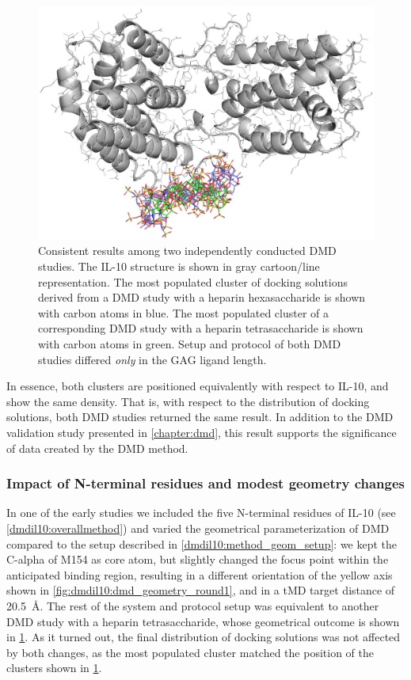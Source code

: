 \begin{figure}
\centering
\includegraphics[width=1.0\textwidth]{gfx/dmdil10/hp_hexa_vs_tetra_clusters_position_match_cropped.jpg}
\caption[]{Consistent results among two independently conducted DMD studies. The
IL-10 structure is shown in gray cartoon/line representation. The most populated
cluster of docking solutions derived from a DMD study with a heparin
hexasaccharide is shown with carbon atoms in blue. The most populated cluster of
a corresponding DMD study with a heparin tetrasaccharide is shown with carbon
atoms in green. Setup and protocol of both DMD studies differed \textit{only} in
the GAG ligand length.}
\label{fig:dmdil10:hp_hexa_vs_tetra_clusters_position_match}
\end{figure}

In essence, both clusters are positioned equivalently with respect to IL-10, and
show the same density. That is, with respect to the distribution of docking
solutions, both DMD studies returned the same result. In addition to the DMD
validation study presented in \cref{chapter:dmd}, this result supports the
significance of data created by the DMD method.


\subsubsection{Impact of N-terminal residues and modest geometry changes}

In one of the early studies we included the five N-terminal residues of IL-10
(see \ref{dmdil10:overallmethod}) and varied the geometrical parameterization of
DMD compared to the setup described in \ref{dmdil10:method_geom_setup}: we kept
the C-alpha of M154 as core atom, but slightly changed the focus point within
the anticipated binding region, resulting in a different orientation of the
yellow axis shown in \cref{fig:dmdil10:dmd_geometry_round1}, and in a tMD target
distance of \SI{20.5}{\angstrom}. The rest of the system and protocol setup was
equivalent to another DMD study with a heparin tetrasaccharide, whose
geometrical outcome is shown in
\cref{fig:dmdil10:hp_hexa_vs_tetra_clusters_position_match}. As it turned out,
the final distribution of docking solutions was not affected by both changes, as
the most populated cluster matched the position of the clusters shown in
\cref{fig:dmdil10:hp_hexa_vs_tetra_clusters_position_match}.

